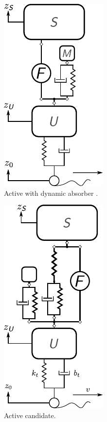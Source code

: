 \begin{figure}
\begin{subfigure}[t]{0.33\textwidth}
\centering
\includegraphics[scale=0.8]{../ch8/figures/csuspension4}
\caption{Active with dynamic absorber \cite{Hrovat1993a, Hrovat1997a}.\label{fig:ch8:csuspension4}}
\end{subfigure}%
\begin{subfigure}[t]{0.33\textwidth}
\centering
\includegraphics[scale=0.8]{../ch8/figures/csuspension5}
\caption{Active candidate.\label{fig:ch8:csuspension5}}
\end{subfigure}%
\begin{subfigure}[t]{0.33\textwidth}
\centering

\end{subfigure}
\end{figure}
